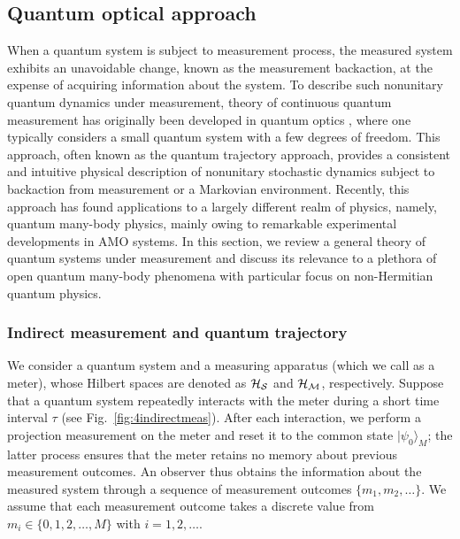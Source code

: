 \documentclass{tADP2e}
\theoremstyle{plain}
\theoremstyle{plain}
\theoremstyle{definition}
\begin{document}
\subsection{Quantum optical approach\label{Sec:qoa}}
When a quantum system is subject to measurement process, the measured system exhibits an unavoidable change, known as the measurement backaction, at the expense of acquiring information about the system.  
To describe such nonunitary quantum dynamics under measurement, theory of continuous quantum measurement has originally been developed in quantum optics \cite{MU89,UM90,DJ92,DR92,GCH92,HC93}, where one typically considers a small quantum system with a few degrees of freedom. This approach, often known as the quantum trajectory approach, provides a consistent and intuitive physical description of nonunitary stochastic dynamics subject to backaction from measurement or a Markovian environment.  Recently, this approach has found applications to a largely different realm of physics, namely, quantum many-body physics,  mainly owing to remarkable experimental developments in AMO systems. In this section, we review a general theory of quantum systems under measurement and discuss its relevance to a plethora of open quantum many-body phenomena with particular focus on non-Hermitian quantum physics.  

\subsubsection{Indirect measurement and quantum trajectory}
\label{sec:qtraj}
We consider a quantum system and a measuring apparatus (which we call as a meter), whose Hilbert spaces are denoted as $\cal{H}_S$ and $\cal{H}_M$, respectively. Suppose that a quantum system repeatedly interacts with the meter during a short time interval $\tau$ (see Fig.~\ref{fig:4indirectmeas}).  After each interaction, we perform a projection measurement on the meter and reset it to the common state $|\psi_0\rangle_{M}$; the latter process ensures that the meter retains no memory about previous measurement outcomes.  An observer thus obtains the information about the measured system through a sequence of measurement outcomes $\{m_1,m_2,\ldots\}$. We assume that each measurement outcome takes a discrete value from $m_i\in\{0,1,2,\ldots,M\}$ with $i=1,2,\ldots$.
\end{document}
